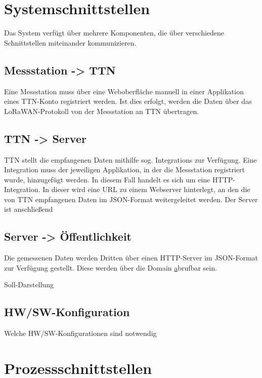 \documentclass[
11pt,
a4paper,
ngerman,
]{article}
\newcommand{\descriptionWhat}[1]{%
	\begin{itshape}%
	#1 \\%
	\end{itshape}%
}
\begin{document}
\section{Systemschnittstellen}

Das System verf\"ugt \"uber mehrere Komponenten, die \"uber verschiedene
Schnittstellen miteinander kommunizieren.

\subsection{Messstation -> TTN}
Eine Messstation muss \"uber eine Weboberfl\"ache manuell in einer Applikation
eines TTN-Konto registriert werden. Ist dies erfolgt, werden die Daten \"uber
das LoRaWAN-Protokoll von der Messstation an TTN \"ubertragen.

\subsection{TTN -> Server}
TTN stellt die empfangenen Daten mithilfe sog. \glqq Integrations\grqq{} zur Verf\"ugung.
Eine \glqq Integration\grqq{} muss der jeweiligen Applikation, in der die Messstation registriert
wurde, hinzugef\"ugt werden.
In diesem Fall handelt es sich um eine \glqq HTTP-Integration\grqq. In dieser wird eine URL zu
einem Webserver hinterlegt, an den die von TTN empfangenen Daten im JSON-Format
weitergeleitet werden. Der Server ist anschlie{\ss}end

\subsection{Server -> \"Offentlichkeit}
Die gemessenen Daten werden Dritten \"uber einen HTTP-Server im JSON-Format zur Verf\"ugung gestellt.
Diese werden \"uber die Domain \href{http://www.berlinerdaten.de/} abrufbar sein.


\descriptionWhat{Soll-Darstellung}

\subsection{HW/SW-Konfiguration}

\descriptionWhat{Welche HW/SW-Konfigurationen sind notwendig}

\newpage

\section{Prozessschnittstellen}
\end{document}
